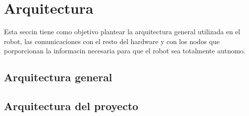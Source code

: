 \chapter{Arquitectura}

Esta seccin tiene como objetivo plantear la arquitectura general utilizada en el robot, las comunicaciones con el resto del hardware y con los nodos que porporcionan la informacin necesaria para que el robot sea totalmente autnomo.

\section{Arquitectura general}

\section{Arquitectura del proyecto}
